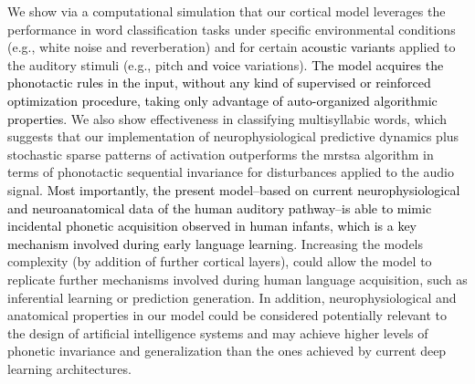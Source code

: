 \documentclass[10pt,letterpaper]{article}
\newcommand{\reviewertwo}[1]{\textcolor{black}{#1}}
\newcommand{\reviewerfour}[1]{\textcolor{black}{#1}}
\begin{document}
We show via a computational simulation that our cortical model leverages the performance in word classification tasks under specific environmental conditions (e.g., white noise and reverberation) and for certain \reviewertwo{acoustic variants} applied to the auditory stimuli (e.g., pitch \reviewerfour{and voice} variations). \reviewerfour{The model acquires the phonotactic rules in the input, without any kind of supervised or reinforced optimization procedure, taking only advantage of auto-organized algorithmic properties}. We also show effectiveness in classifying multisyllabic words, which suggests that our implementation of neurophysiological predictive dynamics plus stochastic sparse patterns of activation outperforms the \gls{mrstsa} algorithm in terms of phonotactic sequential invariance for disturbances applied to the audio signal. \reviewerfour{Most importantly, the present model--based on current neurophysiological and neuroanatomical data of the human auditory pathway--is able to mimic incidental phonetic acquisition observed in human infants, which is a key mechanism involved during early language learning}. Increasing the models complexity (by addition of further cortical layers), could allow the model to replicate further mechanisms involved during human language acquisition, such as inferential learning or prediction generation. In addition, neurophysiological and anatomical properties in our model could be considered potentially relevant to the design of artificial intelligence systems and may achieve higher levels of phonetic invariance and generalization than the ones achieved by current deep learning architectures.


\end{document}
